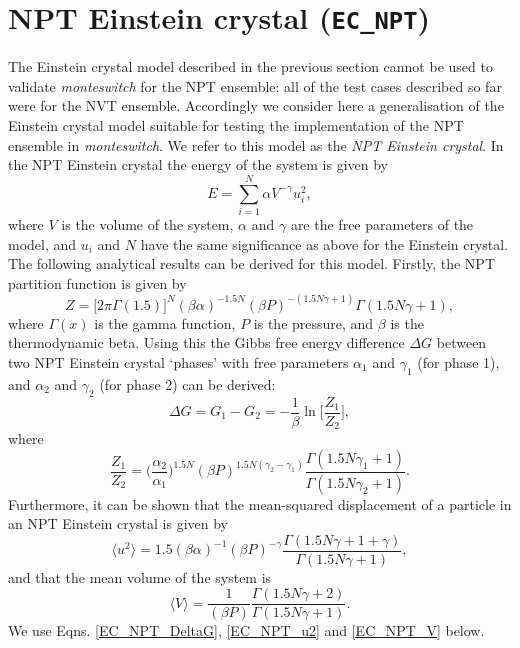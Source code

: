 \documentclass{report}
\begin{document}
\section{NPT Einstein crystal (\texttt{EC\_NPT})}
The Einstein crystal model described in the previous section cannot be used to validate \emph{monteswitch} for the NPT ensemble: all of the test cases
described so far were for the NVT ensemble. Accordingly we consider here a generalisation of the Einstein crystal model suitable for testing the 
implementation of the NPT ensemble in \emph{monteswitch}. We refer to this model as the \emph{NPT Einstein crystal}. In the NPT Einstein crystal the 
energy of the system is given by
\begin{equation}
E=\sum_{i=1}^N\alpha V^{-\gamma} u_i^2,
\end{equation}
where $V$ is the volume of the system, $\alpha$ and $\gamma$ are the free parameters of the model, and $u_i$ and $N$ have the same significance
as above for the Einstein crystal.
The following analytical results can be derived for this model. Firstly, the NPT partition function is given by
\begin{equation}
Z=\bigl[2\pi\Gamma(1.5)\bigr]^N(\beta\alpha)^{-1.5N}(\beta P)^{-(1.5N\gamma+1)}\Gamma(1.5N\gamma+1),
\end{equation}
where $\Gamma(x)$ is the gamma function, $P$ is the pressure, and $\beta$ is the thermodynamic beta. 
Using this the Gibbs free energy difference $\Delta G$ between two NPT Einstein crystal `phases' with free parameters $\alpha_1$ and 
$\gamma_1$ (for phase 1), and $\alpha_2$ and $\gamma_2$ (for phase 2) can be derived:
\begin{equation}\label{EC_NPT_DeltaG}
\Delta G=G_1-G_2=-\frac{1}{\beta}\ln\biggl[\frac{Z_1}{Z_2}\biggr],
\end{equation}
where
\begin{equation}
\frac{Z_1}{Z_2}=\biggr(\frac{\alpha_2}{\alpha_1}\biggr)^{1.5N}(\beta P)^{1.5N(\gamma_2-\gamma_1)}\frac{\Gamma(1.5N\gamma_1+1)}{\Gamma(1.5N\gamma_2+1)}.
\end{equation}
Furthermore, it can be shown that the mean-squared displacement of a particle in an NPT Einstein crystal is given by
\begin{equation}\label{EC_NPT_u2}
\langle u^2\rangle = 1.5(\beta\alpha)^{-1}(\beta P)^{-\gamma}\frac{\Gamma(1.5N\gamma+1+\gamma)}{\Gamma(1.5N\gamma+1)},
\end{equation}
and that the mean volume of the system is
\begin{equation}\label{EC_NPT_V}
\langle V\rangle = \frac{1}{(\beta P)}\frac{\Gamma(1.5N\gamma+2)}{\Gamma(1.5N\gamma+1)}.
\end{equation}
We use Eqns. \eqref{EC_NPT_DeltaG}, \eqref{EC_NPT_u2} and \eqref{EC_NPT_V} below.
\end{document}
